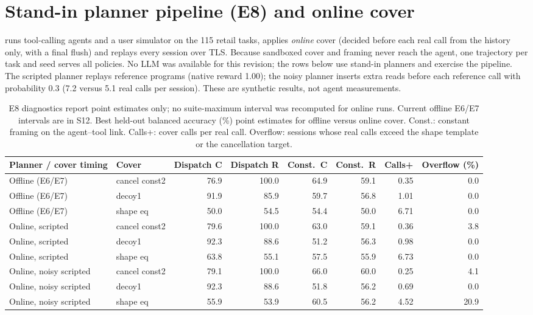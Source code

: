 \section{Stand-in planner pipeline (E8) and online cover}\label{app:e8}
 runs tool-calling agents and a user simulator on the 115 retail tasks, applies \emph{online} cover (decided before each real call from the history only, with a final flush) and replays every session over TLS. Because sandboxed cover and framing never reach the agent, one trajectory per task and seed serves all policies. No LLM was available for this revision; the rows below use stand-in planners and exercise the pipeline. The scripted planner replays reference programs (native reward 1.00); the noisy planner inserts extra reads before each reference call with probability 0.3 (7.2 versus 5.1 real calls per session). These are synthetic results, not agent measurements.
\begin{table}[!ht]\centering\scriptsize
\caption{E8 diagnostics report point estimates only; no suite-maximum interval was recomputed for online runs. Current offline E6/E7 intervals are in S12. Best held-out balanced accuracy (\%) point estimates for offline versus online cover. Const.: constant framing on the agent--tool link. Calls+: cover calls per real call. Overflow: sessions whose real calls exceed the shape template or the cancellation target.}
\begin{tabular}{@{}llrrrrrr@{}}\toprule
Planner / cover timing & Cover & Dispatch C & Dispatch R & Const.\ C & Const.\ R & Calls+ & Overflow (\%)\\\midrule
Offline (E6/E7) & cancel const2 & 76.9 & 100.0 & 64.9 & 59.1 & 0.35 & 0.0\\
Offline (E6/E7) & decoy1 & 91.9 & 85.9 & 59.7 & 56.8 & 1.01 & 0.0\\
Offline (E6/E7) & shape eq & 50.0 & 54.5 & 54.4 & 50.0 & 6.71 & 0.0\\
\midrule
Online, scripted & cancel const2 & 79.6 & 100.0 & 63.0 & 59.1 & 0.36 & 3.8\\
Online, scripted & decoy1 & 92.3 & 88.6 & 51.2 & 56.3 & 0.98 & 0.0\\
Online, scripted & shape eq & 63.8 & 55.1 & 57.5 & 55.9 & 6.73 & 0.0\\
\midrule
Online, noisy scripted & cancel const2 & 79.1 & 100.0 & 66.0 & 60.0 & 0.25 & 4.1\\
Online, noisy scripted & decoy1 & 92.3 & 88.6 & 51.8 & 56.2 & 0.69 & 0.0\\
Online, noisy scripted & shape eq & 55.9 & 53.9 & 60.5 & 56.2 & 4.52 & 20.9\\
\bottomrule\end{tabular}\end{table}
